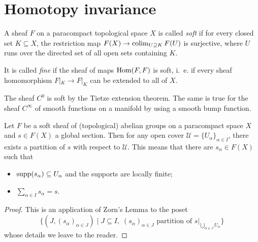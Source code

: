 \documentclass[a4paper,openany]{scrbook}
\begin{document}
\section{Homotopy invariance}

\begin{defn} A sheaf $F$ on a paracompact topological space $X$ is called \emph{soft} if for every closed set $K \subseteq X$, the restriction map $F(X) \to \colim_{U \supseteq K} F(U)$ is surjective, where $U$ runs over the directed set of all open sets containing $K$.

It is called \emph{fine} if the sheaf of maps $\operatorname{Hom}(F,F)$ is soft, i.~e. if every sheaf homomorphism $F|_K \to F|_K$ can be extended to all of $X$.
\end{defn}

\begin{example}
The sheaf $C^0$ is soft by the Tietze extension theorem. The same is true for the sheaf $C^\infty$ of smooth functions on a manifold by using a smooth bump function.
\end{example}

\begin{lemma}\label{lemma:sheafpartitionofunity}
Let $F$ be a soft sheaf of (topological) abelian groups on a paracompact space $X$ and $s \in F(X)$ a global section. Then for any open cover $\mathcal U = \{U_\alpha\}_{\alpha \in I}$, there exists a partition of $s$ with respect to $\mathcal U$. This means that there are $s_\alpha \in F(X)$ such that
\begin{itemize}
\item $\operatorname{supp}(s_\alpha) \subseteq U_\alpha$ and the supports are locally finite;
\item $\sum_{\alpha \in I} s_\alpha = s$.
\end{itemize}
\end{lemma}
\begin{proof}
This is an application of Zorn's Lemma to the poset
\[
\{(J,(s_\alpha)_{\alpha \in J}) \mid J \subseteq I,\; (s_\alpha)_{\alpha \in J} \text{ partition of }s|_{\bigcup_{\alpha \in J} U_\alpha}\}
\]
whose details we leave to the reader.
\end{proof}
\end{document}
